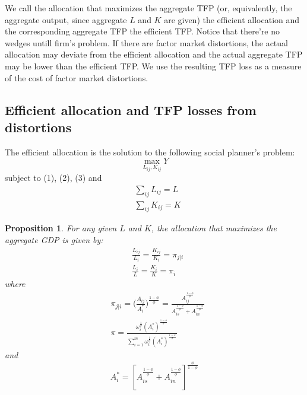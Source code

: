 \documentclass{article}
\begin{document}
    We call the allocation that maximizes the aggregate TFP (or, equivalently, the aggregate output, since aggregate $L$ and $K$ are given) the efficient allocation and the corresponding aggregate TFP the efficient TFP. Notice that there're no wedges untill firm's problem. If there are factor market distortions, the actual allocation may deviate from the efficient allocation and the actual aggregate TFP may be lower than the efficient TFP. We use the resulting TFP loss as a measure of the cost of factor market distortions.

    \subsection*{Efficient allocation and TFP losses from distortions}
    The efficient allocation is the solution to the following social planner’s problem:
    \begin{equation*}
        \max_{L_{ij},K_{ij}}Y
    \end{equation*}
    subject to (1), (2), (3) and
    \begin{align}
        &\sum_{ij}L_{ij}=L\\ &\sum_{ij}K_{ij}=K
    \end{align}

    \theoremstyle{plain}
    \newtheorem{prop}{Proposition}

    \theoremstyle{plain}
    \newtheorem{de}{Definition}
    
    \begin{prop}
        For any given $L$ and $K$, the allocation that maximizes the aggregate GDP is given by:
        \begin{align*}
            &\frac{L_{ij}}{L_i}=\frac{K_{ij}}{K_i}=\pi_{j|i}\\
            &\frac{L_i}{L}=\frac{K_i}{K}=\pi_i
        \end{align*}
        where
        \begin{align*}
            &\pi_{j|i}=\bigl(\frac{A_{ij}}{A_i^*}\bigr)^{\frac{1-\phi}{\phi}}=\frac{A_{ij}^{\frac{1-\phi}{\phi}}}{A_{is}^{\frac{1-\phi}{\phi}}+A_{in}^{\frac{1-\phi}{\phi}}}\\
            &\pi=\frac{\omega_i^{\frac{1}{\sigma}} (A_i^*)^{\frac{1-\sigma}{\sigma}}}{\sum_{i=1}^m \omega_i^{\frac{1}{\sigma}} (A_i^*)^{\frac{1-\sigma}{\sigma}}}
        \end{align*}
        and
        \begin{equation*}
            A_i^*=[A_{is}^{\frac{1-\phi}{\phi}}+A_{in}^{\frac{1-\phi}{\phi}}]^{\frac{\phi}{1-\phi}}
        \end{equation*}
    \end{prop}
\end{document}
